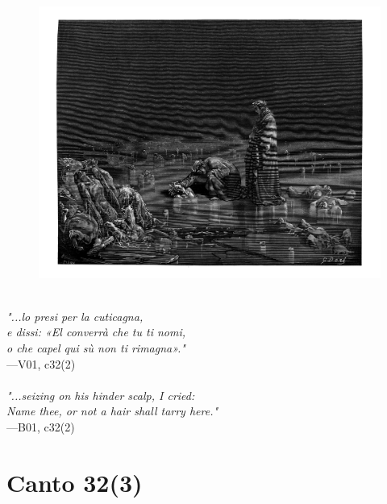 \documentclass[../Dore_vision.tex]{subfiles}
\begin{document}
\begin{figure}[ht]
\centering
\includegraphics[height=\figsize]{illustrations/book_1/V01, c32(2).jpg}
\end{figure}

\begin{center}
\begin{minipage}{0.8\linewidth}
\textit{\\
"...lo presi per la cuticagna,\\e dissi: «El converrà che tu ti nomi,\\o che capel qui sù non ti rimagna»."} \\
—V01, c32(2) \\~\\
\textit{"...seizing on his hinder scalp, I cried:\\ \textquotesingle Name thee, or not a hair shall tarry here.\textquotesingle"} \\
—B01, c32(2)
\end{minipage}
\end{center}

\newpage

\section{Canto 32(3)}
\end{document}
